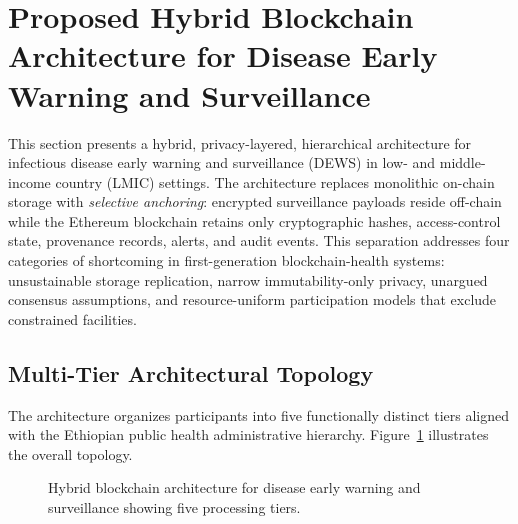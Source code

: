 \documentclass[AMA,LATO1COL]{WileyNJD-v2}
\begin{document}
\section{Proposed Hybrid Blockchain Architecture for Disease Early Warning and Surveillance}\label{sec:model}

This section presents a hybrid, privacy-layered, hierarchical architecture for infectious disease early warning and surveillance (DEWS) in low- and middle-income country (LMIC) settings. The architecture replaces monolithic on-chain storage with \emph{selective anchoring}: encrypted surveillance payloads reside off-chain while the Ethereum blockchain retains only cryptographic hashes, access-control state, provenance records, alerts, and audit events. This separation addresses four categories of shortcoming in first-generation blockchain-health systems: unsustainable storage replication, narrow immutability-only privacy, unargued consensus assumptions, and resource-uniform participation models that exclude constrained facilities.

\subsection{Multi-Tier Architectural Topology}\label{subsec:topology}

The architecture organizes participants into five functionally distinct tiers aligned with the Ethiopian public health administrative hierarchy. Figure~\ref{fig:architecture} illustrates the overall topology.

\begin{figure}[!ht]
\centering
{}
\caption{Hybrid blockchain architecture for disease early warning and surveillance showing five processing tiers.}\label{fig:architecture}
\end{figure}
\end{document}
